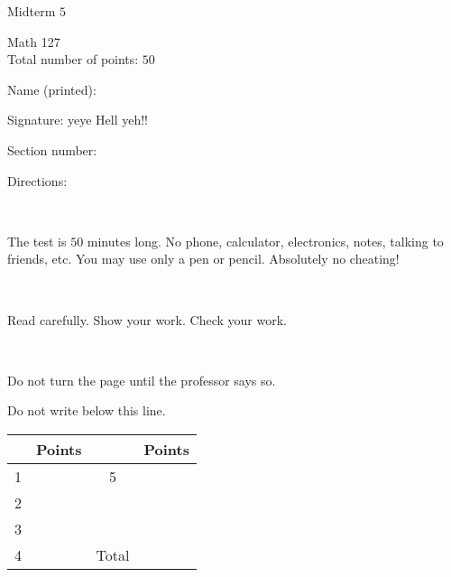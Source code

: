 \documentclass{article}
\begin{document}
\renewcommand{\headrulewidth}{0pt}
\fontsize{11}{18}\selectfont
\begin{center}
\begin{bfseries}
\noindent \Large{Midterm $5$} \\ 
\end{bfseries} 
\vspace{0.3cm}
\large{Math 127} \\
\large{Total number of points: $50$}
\end{center}

\begin{center}
Name (printed): \underline{\hspace{4in}}
 

 
Signature: \underline{\hspace{4in}}
yeye Hell yeh!!

 
Section number: \underline{\hspace{1in}}
 
 
\end{center}

\normalsize

\vfill

Directions:

\

The test is $50$ minutes long. No phone, calculator, electronics, notes, talking to friends, etc. You may use only a pen or pencil. Absolutely no cheating!

\


Read carefully. Show your work. Check your work.

\

Do not turn the page until the professor says so.
\vfill

\large
Do not write below this line. 


\noindent\makebox[\linewidth]{\rule{\paperwidth}{0.4pt}}

\vfill

\huge
{%
\begin{center}
\begin{tabular}{| c | c | c | c |}
\hline
  & Points &  & Points \\ \hline
1 &  & 5 & \\ \hline
2 &  &  & \\ \hline
3 &  &  & \\ \hline
4 &  & Total & \\ \hline 
\end{tabular}
\end{center}
}%
\end{document}
